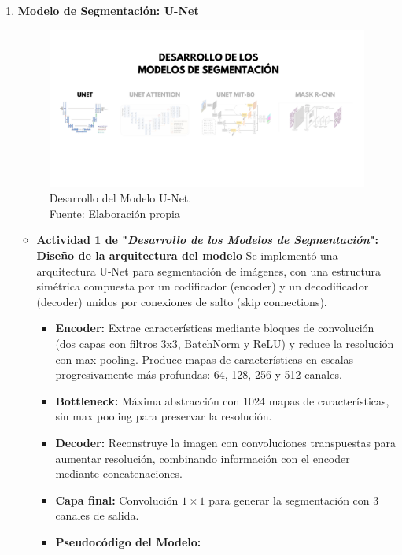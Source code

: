 \begin{enumerate}
  \item \textbf{Modelo de Segmentación: U-Net}
  \begin{figure}[H]
	\begin{center}
		\includegraphics[width=1\textwidth]{4/figures/desunet.png}
		\caption[Desarrollo del Modelo U-Net]{Desarrollo del Modelo U-Net.\\
		Fuente: Elaboración propia}
		\label{4:figdesunet}
	\end{center}
\end{figure}
  \begin{itemize}

  \item\textbf{Actividad 1 de "\textit{Desarrollo de los Modelos de Segmentación}": Diseño de la arquitectura del modelo}
Se implementó una arquitectura U-Net para segmentación de imágenes, con una estructura simétrica compuesta por un codificador (encoder) y un decodificador (decoder) unidos por conexiones de salto (skip connections).
\begin{itemize}
\item \textbf{Encoder:} Extrae características mediante bloques de convolución (dos capas con filtros 3x3, BatchNorm y ReLU) y reduce la resolución con max pooling. Produce mapas de características en escalas progresivamente más profundas: 64, 128, 256 y 512 canales.
\item \textbf{Bottleneck:} Máxima abstracción con 1024 mapas de características, sin max pooling para preservar la resolución.
\item \textbf{Decoder:} Reconstruye la imagen con convoluciones transpuestas para aumentar resolución, combinando información con el encoder mediante concatenaciones.
\item \textbf{Capa final:} Convolución $1\times1$ para generar la segmentación con 3 canales de salida.
\item \textbf{Pseudocódigo del Modelo:}


\end{itemize}
\end{itemize}
\end{enumerate}
